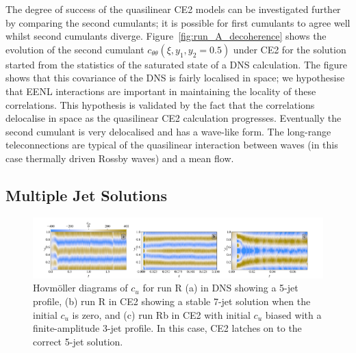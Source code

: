 \documentclass{jfm}
\newcommand{\cu}{c_u}
\newcommand{\ctt}{c_{\theta \theta}}
\begin{document}
The degree of success of the quasilinear CE2 models can be investigated further by comparing the second cumulants; it is possible for first cumulants to agree well whilst second cumulants diverge. Figure~\ref{fig:run_A_decoherence} shows the evolution of the second cumulant $\ctt(\xi, y_1, y_2 = 0.5)$ under CE2 for the solution started from the statistics of the saturated state of a DNS calculation. The figure shows that this covariance of the DNS is fairly localised in space; we hypothesise that EENL interactions are important in maintaining the locality of these correlations. This hypothesis is validated by the fact that the correlations delocalise in space as the quasilinear CE2 calculation progresses. Eventually the second cumulant is very delocalised and has a wave-like form. The long-range teleconnections are typical of the quasilinear interaction between waves (in this case thermally driven Rossby waves) and a mean flow.

\subsection{Multiple Jet Solutions}
\begin{figure}
  \centering
  \includegraphics[width=\textwidth]{../../figs/run_R_S_hov_cu_dns_ce2.pdf}
  \caption{Hovm\"oller diagrams of $\cu$ for run R (a) in DNS showing a 5-jet profile, (b) run R in CE2 showing a stable 7-jet solution when the initial $\cu$ is zero, and (c) run Rb in CE2 with initial $\cu$ biased with a finite-amplitude 3-jet profile. In this case, CE2 latches on to the correct 5-jet solution.}
  \label{fig:hov_run_R}
\end{figure}
\end{document}
